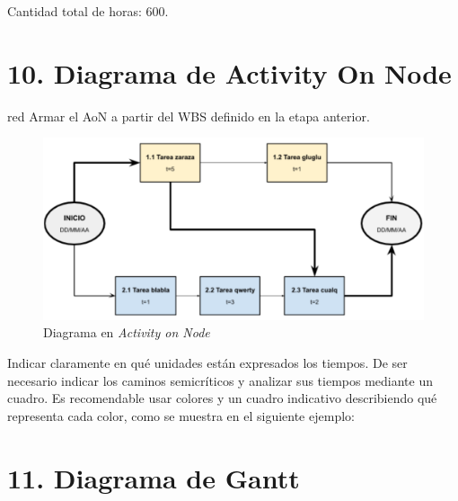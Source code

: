 \documentclass[
11pt, %
]{charter}
\begin{document}
Cantidad total de horas: 600.

\section{10. Diagrama de Activity On Node}
\label{sec:AoN}

\begin{consigna}{red}
Armar el AoN a partir del WBS definido en la etapa anterior. 



\end{consigna}

\begin{figure}[htpb]
\centering 
\includegraphics[width=.8\textwidth]{./Figuras/AoN.png}
\caption{Diagrama en \textit{Activity on Node}}
\label{fig:AoN}
\end{figure}

Indicar claramente en qué unidades están expresados los tiempos.
De ser necesario indicar los caminos semicríticos y analizar sus tiempos mediante un cuadro.
Es recomendable usar colores y un cuadro indicativo describiendo qué representa cada color, como se muestra en el siguiente ejemplo:



\section{11. Diagrama de Gantt}
\label{sec:gantt}
\end{document}
